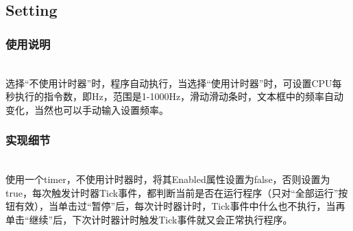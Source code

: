 \documentclass{article}
\begin{document}
\begin{spacing}{1.5}
\subsection{Setting}
\subsubsection{使用说明}
\noindent
{}
\setlength{\hangindent}{3.5em}\\
选择“不使用计时器”时，程序自动执行，当选择“使用计时器”时，可设置CPU每秒执行的指令数，即Hz，范围是1-1000Hz，滑动滑动条时，文本框中的频率自动变化，当然也可以手动输入设置频率。
\subsubsection{实现细节}
\noindent
{}
\setlength{\hangindent}{3.5em}\\
使用一个timer，不使用计时器时，将其Enabled属性设置为false，否则设置为true，每次触发计时器Tick事件，都判断当前是否在运行程序（只对“全部运行”按钮有效），当单击过“暂停”后，每次计时器计时，Tick事件中什么也不执行，当再单击“继续”后，下次计时器计时触发Tick事件就又会正常执行程序。

\end{spacing}
\end{document}

